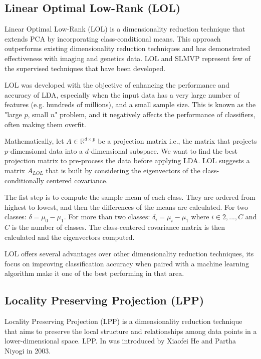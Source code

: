 \subsection{Linear Optimal Low-Rank (LOL)}

Linear Optimal Low-Rank (LOL) \cite{lol} is a dimensionality reduction technique that extends PCA by incorporating class-conditional means. This approach outperforms existing dimensionality reduction techniques and has demonstrated effectiveness with imaging and genetics data. LOL and SLMVP represent few of the supervised techniques that have been developed.

LOL was developed with the objective of enhancing the performance and accuracy of LDA, especially when the input data has a very large number of features (e.g. hundreds of millions), and a small sample size. This is known as the "large $p$, small $n$" problem, and it negatively affects the performance of classifiers, often making them overfit.

Mathematically, let $A \in \mathbb{R}^{d \times p}$ be a projection matrix i.e., the matrix that projects $p$-dimensional data into a $d$-dimensional subspace. We want to find the best projection matrix to pre-process the data before applying LDA. LOL suggests a matrix $A_{LOL}$ that is built by considering the eigenvectors of the class-conditionally centered covariance.

The fist step is to compute the sample mean of each class. They are ordered from highest to lowest, and then the differences of the means are calculated. For two classes: $\delta = \mu_0 - \mu_1$. For more than two classes: $\delta_i = \mu_i - \mu_1$ where $i \in {2,...,C}$ and $C$ is the number of classes. The class-centered covariance matrix is then calculated and the eigenvectors computed.

LOL offers several advantages over other dimensionality reduction techniques, its focus on improving classification accuracy when paired with a machine learning algorithm make it one of the best performing in that area.

\subsection{Locality Preserving Projection (LPP)}

Locality Preserving Projection (LPP) \cite{lpp} is a dimensionality reduction technique that aims to preserve the local structure and relationships among data points in a lower-dimensional space. LPP. In was introduced by Xiaofei He and Partha Niyogi in 2003.

